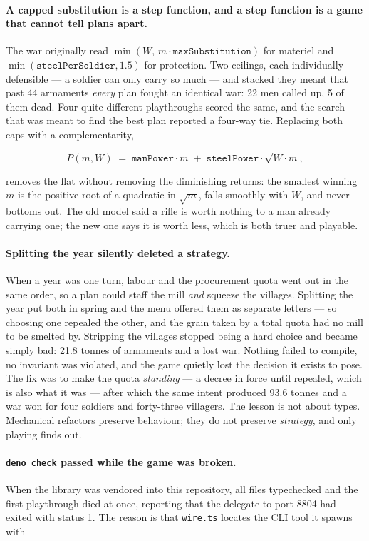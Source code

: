 \documentclass[11pt,a4paper]{article}
\begin{document}
\paragraph{A capped substitution is a step function, and a step function is a
game that cannot tell plans apart.} The war originally read
$\min(W,\, m \cdot \texttt{maxSubstitution})$ for materiel and
$\min(\texttt{steelPerSoldier}, 1.5)$ for protection. Two ceilings, each
individually defensible --- a soldier can only carry so much --- and stacked
they meant that past 44 armaments \emph{every} plan fought an identical war:
22 men called up, 5 of them dead. Four quite different playthroughs scored the
same, and the search that was meant to find the best plan reported a four-way
tie. Replacing both caps with a complementarity,

\[ P(m, W) \;=\; \texttt{manPower} \cdot m \;+\; \texttt{steelPower} \cdot \sqrt{W \cdot m}, \]

\noindent removes the flat without removing the diminishing returns: the
smallest winning $m$ is the positive root of a quadratic in $\sqrt{m}$, falls
smoothly with $W$, and never bottoms out. The old model said a rifle is worth
nothing to a man already carrying one; the new one says it is worth less, which
is both truer and playable.

\paragraph{Splitting the year silently deleted a strategy.} When a year was one
turn, labour and the procurement quota went out in the same order, so a plan
could staff the mill \emph{and} squeeze the villages. Splitting the year put
both in spring and the menu offered them as separate letters --- so choosing one
repealed the other, and the grain taken by a total quota had no mill to be
smelted by. Stripping the villages stopped being a hard choice and became
simply bad: 21.8 tonnes of armaments and a lost war. Nothing failed to compile,
no invariant was violated, and the game quietly lost the decision it exists to
pose. The fix was to make the quota \emph{standing} --- a decree in force until
repealed, which is also what it was --- after which the same intent produced
93.6 tonnes and a war won for four soldiers and forty-three villagers. The
lesson is not about types. Mechanical refactors preserve behaviour; they do not
preserve \emph{strategy}, and only playing finds out.

\paragraph{\texttt{deno check} passed while the game was broken.} When the
library was vendored into this repository, all files typechecked and the first
playthrough died at once, reporting that the delegate to port 8804 had exited
with status 1. The reason is that \verb|wire.ts| locates the CLI tool it spawns
with
\end{document}
